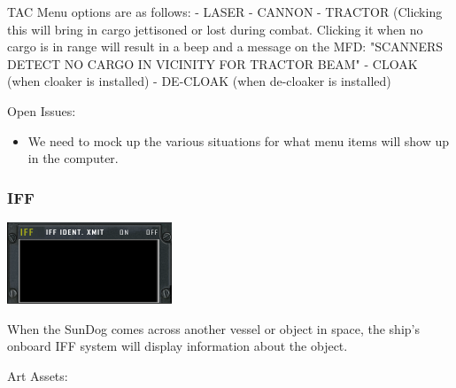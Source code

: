 \begin{itemize}
TAC Menu options are as follows: 
- LASER
- CANNON
- TRACTOR (Clicking this will bring in cargo jettisoned or lost during combat. Clicking it when no cargo is in range will result in a beep and a message on the MFD: "SCANNERS DETECT NO CARGO IN VICINITY FOR TRACTOR BEAM"
- CLOAK (when cloaker is installed)
- DE-CLOAK (when de-cloaker is installed)



Open Issues:
\begin{itemize}


\item We need to mock up the various situations for what menu items
will show up in the computer. 
\end{itemize}

\subsubsection{IFF}

\includegraphics[scale=0.70]{images/iff.png}

When the SunDog comes across another vessel or object in space, the ship's
onboard IFF system will display information about the object.  

Art Assets:


\end{itemize}
